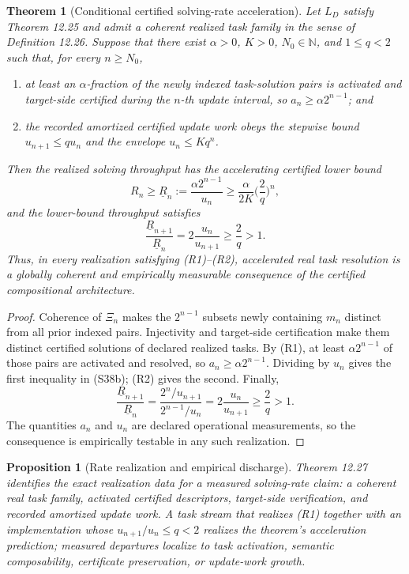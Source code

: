 \documentclass[11pt]{article}
\newtheorem{theorem}{Theorem}
\newtheorem{proposition}{Proposition}
\theoremstyle{definition}
\begin{document}
\begin{theorem}[Conditional certified solving-rate acceleration]
Let $L_D$ satisfy Theorem 12.25 and admit a coherent realized task family in the sense of Definition 12.26. Suppose that there exist $\alpha > 0$, $K > 0$, $N_0 \in \mathbb{N}$, and $1 \leq q < 2$ such that, for every $n \geq N_0$,
\begin{enumerate}[label=(R\arabic*)]
\item[(R1)] at least an $\alpha$-fraction of the newly indexed task-solution pairs is activated and target-side certified during the $n$-th update interval, so $a_n \geq \alpha 2^{n-1}$; and
\item[(R2)] the recorded amortized certified update work obeys the stepwise bound $u_{n+1} \leq q u_n$ and the envelope $u_n \leq K q^n$.
\end{enumerate}
Then the realized solving throughput has the accelerating certified lower bound
\begin{equation}
R_n \geq \underline{R}_n := \frac{\alpha 2^{n-1}}{u_n} \geq \frac{\alpha}{2K}\Big(\frac{2}{q}\Big)^n, \tag{S38b}
\end{equation}
and the lower-bound throughput satisfies
\begin{equation}
\frac{\underline{R}_{n+1}}{\underline{R}_n} = 2\frac{u_n}{u_{n+1}} \geq \frac{2}{q} > 1. \tag{S38c}
\end{equation}
Thus, in every realization satisfying (R1)--(R2), accelerated real task resolution is a globally coherent and empirically measurable consequence of the certified compositional architecture.
\end{theorem}

\begin{proof}
Coherence of $\Xi_n$ makes the $2^{n-1}$ subsets newly containing $m_n$ distinct from all prior indexed pairs. Injectivity and target-side certification make them distinct certified solutions of declared realized tasks. By (R1), at least $\alpha 2^{n-1}$ of those pairs are activated and resolved, so $a_n \geq \alpha 2^{n-1}$. Dividing by $u_n$ gives the first inequality in (S38b); (R2) gives the second. Finally,
\[
\frac{\underline{R}_{n+1}}{\underline{R}_n} = \frac{2^n / u_{n+1}}{2^{n-1}/u_n} = 2\frac{u_n}{u_{n+1}} \geq \frac{2}{q} > 1.
\]
The quantities $a_n$ and $u_n$ are declared operational measurements, so the consequence is empirically testable in any such realization.
\end{proof}

\begin{proposition}[Rate realization and empirical discharge]
Theorem 12.27 identifies the exact realization data for a measured solving-rate claim: a coherent real task family, activated certified descriptors, target-side verification, and recorded amortized update work. A task stream that realizes (R1) together with an implementation whose $u_{n+1}/u_n \leq q < 2$ realizes the theorem's acceleration prediction; measured departures localize to task activation, semantic composability, certificate preservation, or update-work growth.
\end{proposition}
\end{document}
